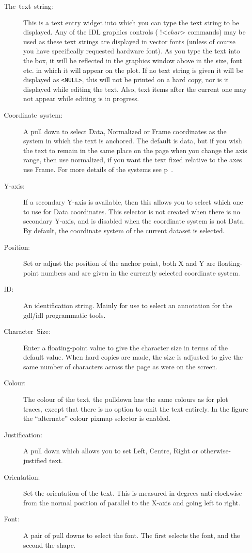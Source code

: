 \documentclass[11pt,twoside,english]{article}
\begin{document}
\begin{description}
\item [The~text~string:]This is a text entry widget into which
  you can type the text string to be displayed. Any of the IDL graphics
  controls ( !<\textit{char}> commands) may be used as these text
  strings are displayed in vector fonts (unless of course you have
  specifically requested hardware font). As you type the text into the
  box, it will be reflected in the graphics window above in the size,
  font etc. in which it will appear on the plot. If no text string is
  given it will be displayed as \texttt{<NULL>}, this will not be
  printed on a hard copy, nor is it displayed while editing the
  text. Also, text items after the current one may not appear while
  editing is in progress.
\item [Coordinate~system:]A pull down to select Data, Normalized or
  Frame coordinates as the system in which the text is anchored. The
  default is data, but if you wish the text to remain in the same place
  on the page when you change the axis range, then use normalized, if
  you want the text fixed relative to the axes use Frame. For more
  details of the systems see p~\pageref{coordsys}.
\item[Y-axis:] If a secondary Y-axis is available, then this allows you
  to select which one to use for Data coordinates. This selector is not
  created when there is no secondary Y-axis, and is disabled when the
  coordinate system is not Data. By default, the coordinate system of
  the current dataset is selected.
\item [Position:]Set or adjust the position of the anchor point, both X
  and Y are floating-point numbers and are given in the currently
  selected coordinate system.
\item[ID:] An identification string. Mainly for use to select an
  annotation for the gdl/idl programmatic tools.
\item [Character~Size:]Enter a floating-point value to give the
  character size in terms of the default value. When hard copies are
  made, the size is adjusted to give the same number of characters
  across the page as were on the screen.
\item [Colour:]The colour of the text, the pulldown has the same
  colours as for plot traces, except that there is no option to omit
  the text entirely. In the figure the ``alternate'' colour pixmap
  selector is enabled.
\item [Justification:]A pull down which allows you to set Left, Centre,
  Right or otherwise-justified text. 
\item [Orientation:]Set the orientation of the text. This is measured
  in degrees anti-clockwise from the normal position of parallel to the
  X-axis and going left to right.
\item [Font:] A pair of pull downs to select the font. The first
  selects the font, and the second the shape.
\end{description}
\end{document}
